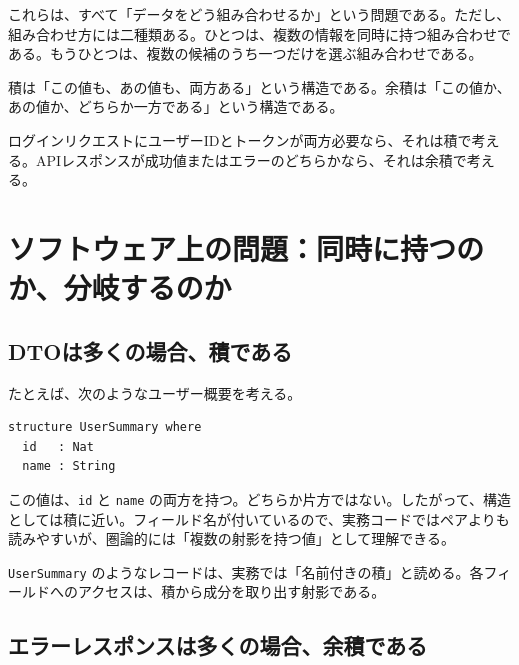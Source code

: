 これらは、すべて「データをどう組み合わせるか」という問題である。ただし、組み合わせ方には二種類ある。ひとつは、複数の情報を同時に持つ組み合わせである。もうひとつは、複数の候補のうち一つだけを選ぶ組み合わせである。

\begin{intuitionbox}
積は「この値も、あの値も、両方ある」という構造である。余積は「この値か、あの値か、どちらか一方である」という構造である。

ログインリクエストにユーザーIDとトークンが両方必要なら、それは積で考える。APIレスポンスが成功値またはエラーのどちらかなら、それは余積で考える。
\end{intuitionbox}


\section{ソフトウェア上の問題：同時に持つのか、分岐するのか}

\subsection{DTOは多くの場合、積である}

たとえば、次のようなユーザー概要を考える。

\begin{listing}[htbp]
\begin{verbatim}
structure UserSummary where
  id   : Nat
  name : String
\end{verbatim}
\caption{複数フィールドを持つレコード}
\label{lst:ch07_record_intuition}
\end{listing}

この値は、\texttt{id} と \texttt{name} の両方を持つ。どちらか片方ではない。したがって、構造としては積に近い。フィールド名が付いているので、実務コードではペアよりも読みやすいが、圏論的には「複数の射影を持つ値」として理解できる。

\begin{softwarebox}
\texttt{UserSummary} のようなレコードは、実務では「名前付きの積」と読める。各フィールドへのアクセスは、積から成分を取り出す射影である。
\end{softwarebox}

\subsection{エラーレスポンスは多くの場合、余積である}

